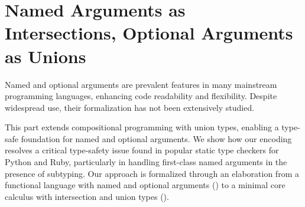 \chapter{Named Arguments as Intersections, Optional Arguments as Unions} \label{ch:arguments}

Named and optional arguments are prevalent features in many mainstream
programming languages, enhancing code readability and flexibility. Despite
widespread use, their formalization has not been extensively studied.

This part extends compositional programming with union types, enabling a
type-safe foundation for named and optional arguments. We show how our encoding
resolves a critical type-safety issue found in popular static type checkers for
Python and Ruby, particularly in handling first-class named arguments in the
presence of subtyping. Our approach is formalized through an elaboration from a
functional language with named and optional arguments (\uaena) to a minimal core
calculus with intersection and union types (\lambdaiu).






